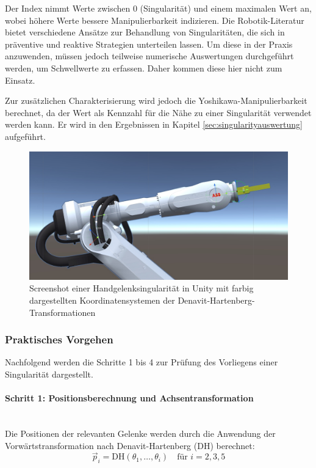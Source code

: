 Der Index nimmt Werte zwischen 0 (Singularität) und einem maximalen Wert an,
wobei höhere Werte bessere Manipulierbarkeit indizieren. Die Robotik-Literatur
bietet verschiedene Ansätze zur Behandlung von Singularitäten, die sich in
präventive und reaktive Strategien unterteilen lassen. Um diese in der Praxis
anzuwenden, müssen jedoch teilweise numerische Auswertungen durchgeführt werden,
um Schwellwerte zu erfassen. Daher kommen diese hier nicht zum Einsatz.

Zur zusätzlichen Charakterisierung wird jedoch die Yoshikawa-Manipulierbarkeit
berechnet, da der Wert als Kennzahl für die Nähe zu einer Singularität verwendet
werden kann. Er wird in den Ergebnissen in Kapitel
\ref{sec:singularityauswertung} aufgeführt.

\begin{figure}[H]
  \centering
  \includegraphics[width=\linewidth]{Figures/wristSingularityScreenshot.jpg}
  \caption{Screenshot einer Handgelenksingularität in Unity mit farbig
  dargestellten Koordinatensystemen der Denavit-Hartenberg-Transformationen }
  \label{figure:wristSingularity}
\end{figure}

\subsubsection{Praktisches Vorgehen}
Nachfolgend werden die Schritte 1 bis 4 zur Prüfung des Vorliegens
einer Singularität dargestellt.

\paragraph{Schritt 1: Positionsberechnung und Achsentransformation}~\\
Die Positionen der relevanten Gelenke werden durch die Anwendung der
Vorwärtstransformation nach Denavit-Hartenberg (DH)
berechnet:
\begin{equation}
  \vec{p}_i = \text{DH}(\theta_1, \ldots, \theta_i) \quad \text{für }
  i = 2, 3, 5
  \label{eq:position_calculation}
\end{equation}

